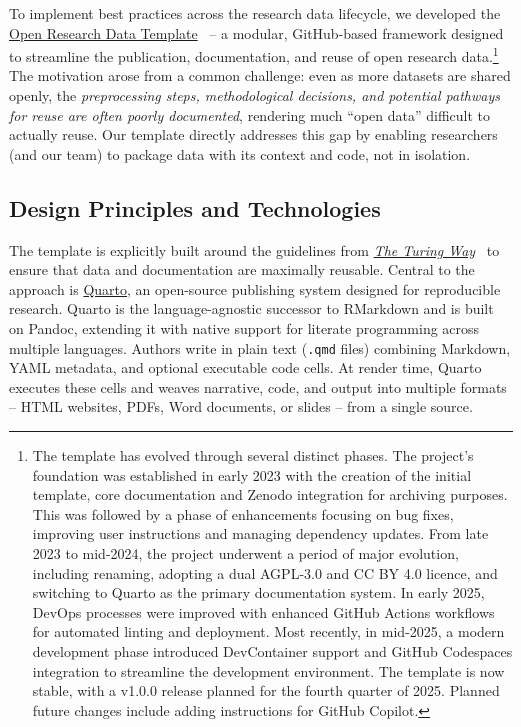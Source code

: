 \documentclass[final]{anthology-ch} %
\begin{document}
To implement best practices across the research data lifecycle, we developed the \href{https://github.com/maehr/open-research-data-template}{Open Research Data Template}~\cite{mahr2023g} -- a modular, GitHub-based framework designed to streamline the publication, documentation, and reuse of open research data.\footnote{The template has evolved through several distinct phases. The project's foundation was established in early 2023 with the creation of the initial template, core documentation and Zenodo integration for archiving purposes. This was followed by a phase of enhancements focusing on bug fixes, improving user instructions and managing dependency updates. From late 2023 to mid-2024, the project underwent a period of major evolution, including renaming, adopting a dual AGPL-3.0 and CC BY 4.0 licence, and switching to Quarto as the primary documentation system. In early 2025, DevOps processes were improved with enhanced GitHub Actions workflows for automated linting and deployment. Most recently, in mid-2025, a modern development phase introduced DevContainer support and GitHub Codespaces integration to streamline the development environment. The template is now stable, with a v1.0.0 release planned for the fourth quarter of 2025. Planned future changes include adding instructions for GitHub Copilot.} The motivation arose from a common challenge: even as more datasets are shared openly, the \emph{preprocessing steps, methodological decisions, and potential pathways for reuse are often poorly documented}, rendering much ``open data'' difficult to actually reuse. Our template directly addresses this gap by enabling researchers (and our team) to package data with its context and code, not in isolation.

\subsection{Design Principles and Technologies}\label{design-principles-and-technologies}

The template is explicitly built around the guidelines from \href{https://book.the-turing-way.org/}{\emph{The Turing Way}}~\cite{theturingwaycommunity2025} to ensure that data and documentation are maximally reusable. Central to the approach is \href{https://quarto.org/}{Quarto}, an open-source publishing system designed for reproducible research. Quarto is the language-agnostic successor to RMarkdown and is built on Pandoc, extending it with native support for literate programming across multiple languages. Authors write in plain text (\texttt{.qmd} files) combining Markdown, YAML metadata, and optional executable code cells. At render time, Quarto executes these cells and weaves narrative, code, and output into multiple formats -- HTML websites, PDFs, Word documents, or slides -- from a single source.
\end{document}
